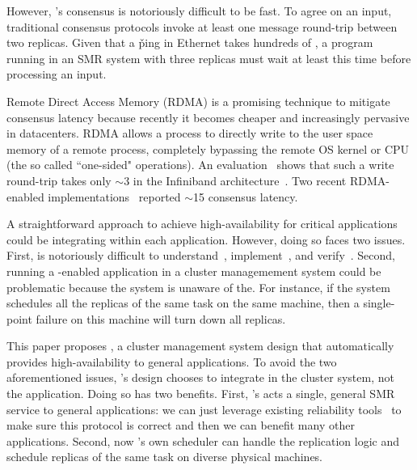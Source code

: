 

However, \paxos's consensus is notoriously difficult to be fast. 
To agree on an input, traditional consensus protocols invoke at least one 
message round-trip between two replicas. Given that a \v{ping} in Ethernet 
takes hundreds of \us, a program running in an SMR system with three replicas 
must wait at least this time before processing an input. 

Remote Direct Access Memory (RDMA) is a promising technique to mitigate 
consensus latency because recently it becomes cheaper and increasingly 
pervasive in datacenters. RDMA allows a process to directly write to the 
user space memory of a remote process, completely bypassing the remote OS 
kernel or CPU (the so called ``one-sided" operations). An 
evaluation~\cite{pilaf:usenix14} shows that such a write round-trip takes only 
$\sim$3 \us in the Infiniband architecture~\cite{infiniband}. Two recent 
RDMA-enabled \paxos implementations~\cite{dare:hpdc15,falcon:github} reported 
$\sim$15 \us consensus latency.

A straightforward approach to achieve high-availability for critical 
applications could be integrating \paxos within each application. However, 
doing so faces two issues. First, \paxos is notoriously difficult to 
understand~\cite{raft:usenix14}, implement~\cite{paxos:practical}, and 
verify~\cite{demeter:sosp11}. Second, running a \paxos-enabled application in a 
cluster managemement system could be problematic because the system is unaware 
of the. For instance, if the system schedules all the replicas of the same 
task on the same machine, then a single-point failure on this machine 
will turn down all replicas. 


This paper proposes \xxx, a cluster management system design that automatically 
provides high-availability to general applications. To avoid the two 
aforementioned issues, \xxx's design chooses to integrate \paxos in the cluster 
system, not the application. Doing so has two benefits. First, \xxx's \paxos 
acts a single, general SMR service to general applications: we can just 
leverage existing reliability tools~\cite{modist:nsdi09,demeter:sosp11} to make 
sure this \paxos protocol is correct and then we can benefit many other 
applications. Second, now \xxx's own scheduler can handle the replication logic 
and schedule replicas of the same task on diverse physical machines.

